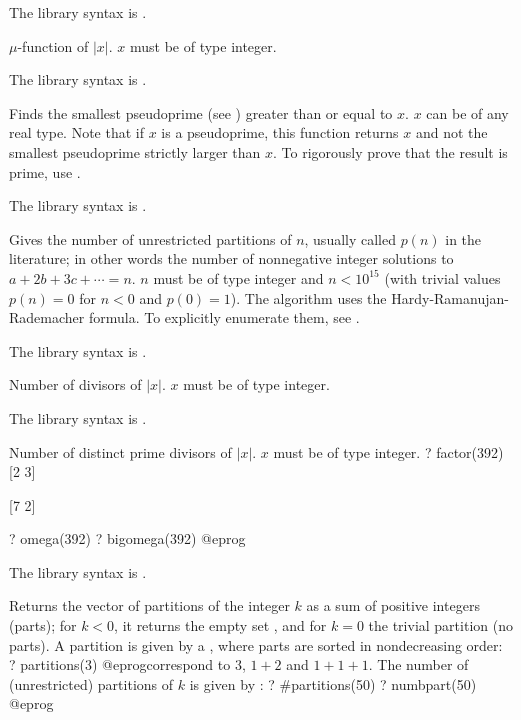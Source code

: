 The library syntax is .

\label{se:moebius}
 $\mu$-function of $|x|$. $x$ must be of type integer.

The library syntax is .

\label{se:nextprime}
Finds the smallest pseudoprime (see
) greater than or equal to $x$. $x$ can be of any real
type. Note that if $x$ is a pseudoprime, this function returns $x$ and not
the smallest pseudoprime strictly larger than $x$. To rigorously prove that
the result is prime, use .

The library syntax is .

\label{se:numbpart}
Gives the number of unrestricted partitions of
$n$, usually called $p(n)$ in the literature; in other words the number of
nonnegative integer solutions to $a+2b+3c+\cdots=n$. $n$ must be of type
integer and $n<10^{15}$ (with trivial values $p(n) = 0$ for $n < 0$ and
$p(0) = 1$). The algorithm uses the Hardy-Ramanujan-Rademacher formula.
To explicitly enumerate them, see .

The library syntax is .

\label{se:numdiv}
Number of divisors of $|x|$. $x$ must be of type integer.

The library syntax is .

\label{se:omega}
Number of distinct prime divisors of $|x|$. $x$ must be of type integer.
\bprog
? factor(392)
[2 3]

[7 2]

? omega(392)
? bigomega(392)
@eprog

The library syntax is .

\label{se:partitions}
Returns the vector of partitions of the integer $k$ as a sum of positive
integers (parts); for $k < 0$, it returns the empty set \kbd{[]}, and for $k
= 0$ the trivial partition (no parts). A partition is given by a
, where parts are sorted in nondecreasing order:
\bprog
? partitions(3)
@eprog\noindent correspond to $3$, $1+2$ and $1+1+1$. The number
of (unrestricted) partitions of $k$ is given
by :
\bprog
? #partitions(50)
? numbpart(50)
@eprog

